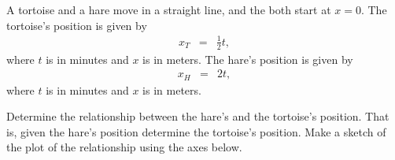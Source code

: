 
\begin{problem}
\item A tortoise and a hare move in a straight line, and the both
  start at $x=0$. The tortoise's position is given by
  \begin{eqnarray*}
    x_T & = & \frac{1}{2} t,
  \end{eqnarray*}
  where $t$ is in minutes and $x$ is in meters.  The hare's position
  is given by
  \begin{eqnarray*}
    x_H & = & 2 t,
  \end{eqnarray*}
  where $t$ is in minutes and $x$ is in meters.

  Determine the relationship between the hare's and the tortoise's
  position. That is, given the hare's position determine the
  tortoise's position. Make a sketch of the plot of the relationship using the axes below.

    \scalebox{0.95}{}

\end{problem}



